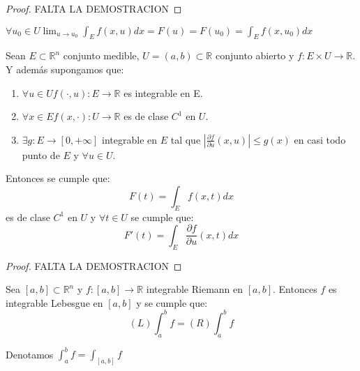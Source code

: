 \begin{proof}
    FALTA LA DEMOSTRACION
\end{proof}
\begin{observación}
    $\forall u_0 \in U \lim_{u \to u_0} \int_{E}f(x, u)dx = F(u) = F(u_0) = \int_{E}f(x, u_0)dx$
\end{observación}
\begin{teorema}
    Sean $E \subset \mathbb{R}^n$ conjunto medible, $U = (a, b) \subset \mathbb{R}$ conjunto abierto y $f: E \times U \to \mathbb{R}$. Y además supongamos que: 
    \begin{enumerate}
        \item $\forall u \in U f(\cdot, u): E \to \mathbb{R}$ es integrable en E.
        \item $\forall x \in E f(x, \cdot): U \to \mathbb{R}$ es de clase $C^1$ en $U$.
        \item $\exists g: E \to [0, +\infty]$ integrable en $E$ tal que $|\frac{\partial f}{\partial u}(x, u)| \leq g(x)$ en casi todo punto de $E$ y $\forall u \in U$.
    \end{enumerate}
    Entonces se cumple que: 
    $$ F(t) = \int_{E}f(x,t)dx $$ es de clase $C^1$ en $U$ y $\forall t \in U$ se cumple que: $$ F'(t) = \int_{E}\frac{\partial f}{\partial u}(x, t)dx $$
\end{teorema}
\begin{proof}
    FALTA LA DEMOSTRACION
\end{proof}
\begin{teorema}
    Sea $[a, b] \subset \mathbb{R}^n$ y $ f:[a,b] \to \mathbb{R}$ integrable Riemann en $[a, b]$. Entonces $f$ es integrable Lebesgue en $[a, b]$ y se cumple que:
    $$ (L) \int_{a}^{b}f = (R) \int_{a}^{b}f $$
\end{teorema}
\begin{observación}
    Denotamos $\int_{a}^{b}f = \int_{[a, b]}f$
\end{observación}
